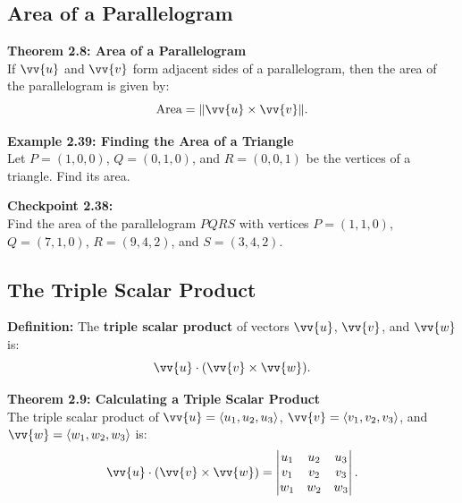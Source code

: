 \documentclass{article}
\begin{document}
\subsection*{Area of a Parallelogram}

\begin{theorembox}
    \textbf{Theorem 2.8: Area of a Parallelogram} \\
    If \(\vv{u}\) and \(\vv{v}\) form adjacent sides of a parallelogram, then the area of the parallelogram is given by:
    \[
    \text{Area} = \|\vv{u} \times \vv{v}\|.
    \]
\end{theorembox}

\begin{examplebox}
    \textbf{Example 2.39: Finding the Area of a Triangle} \\
    Let \(P = (1, 0, 0)\), \(Q = (0, 1, 0)\), and \(R = (0, 0, 1)\) be the vertices of a triangle. Find its area.
\end{examplebox}

\begin{exercisebox}
    \textbf{Checkpoint 2.38:} \\
    Find the area of the parallelogram \(PQRS\) with vertices \(P = (1, 1, 0)\), \(Q = (7, 1, 0)\), \(R = (9, 4, 2)\), and \(S = (3, 4, 2)\).
\end{exercisebox}

\subsection*{The Triple Scalar Product}

\begin{definitionbox}
    \textbf{Definition:} The \textbf{triple scalar product} of vectors \(\vv{u}\), \(\vv{v}\), and \(\vv{w}\) is:
    \[
    \vv{u} \cdot (\vv{v} \times \vv{w}).
    \]
\end{definitionbox}

\begin{theorembox}
    \textbf{Theorem 2.9: Calculating a Triple Scalar Product} \\
    The triple scalar product of \(\vv{u} = \langle u_1, u_2, u_3 \rangle\), \(\vv{v} = \langle v_1, v_2, v_3 \rangle\), and \(\vv{w} = \langle w_1, w_2, w_3 \rangle\) is:
    \[
    \vv{u} \cdot (\vv{v} \times \vv{w}) = \begin{vmatrix}
    u_1 & u_2 & u_3 \\
    v_1 & v_2 & v_3 \\
    w_1 & w_2 & w_3
    \end{vmatrix}.
    \]
\end{theorembox}
\end{document}
